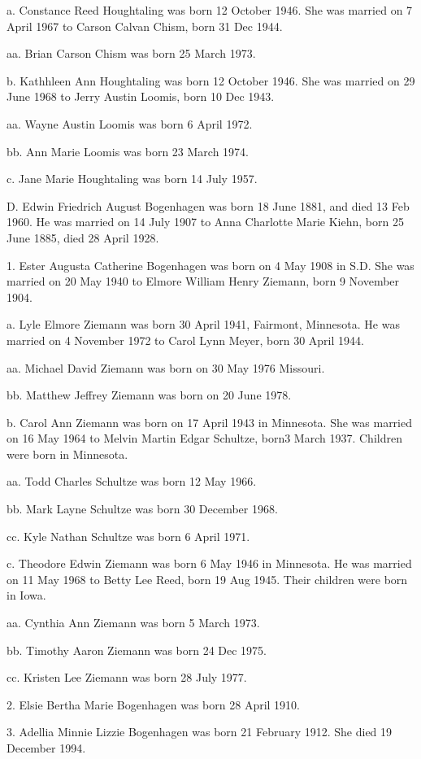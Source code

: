 \documentclass[a4paper]{article}
\begin{document}
a. Constance Reed Houghtaling was born 12 October 1946.  She was married on 7 April 1967 to Carson Calvan Chism, born 31 Dec 1944.
 
aa. Brian Carson Chism was born 25 March 1973.

b. Kathhleen Ann Houghtaling was born 12 October 1946.  She was married on 29 June 1968 to Jerry Austin Loomis, born 10 Dec 1943.
 
aa. Wayne Austin Loomis was born 6 April 1972.

bb. Ann Marie Loomis was born 23 March 1974.

c. Jane Marie Houghtaling was born 14 July 1957.  

D. Edwin Friedrich August Bogenhagen was born 18 June 1881, and died 13 Feb 1960. He was married on 14 July 1907 to Anna Charlotte Marie Kiehn, born 25 June 1885, died 28 April 1928.

1. Ester Augusta Catherine Bogenhagen was born on 4 May 1908 in S.D. She was married on 20 May 1940 to Elmore William Henry Ziemann, born 9 November 1904.

a. Lyle Elmore Ziemann was born 30 April 1941, Fairmont, Minnesota. He was married on 4 November 1972 to Carol Lynn Meyer, born 30 April 1944.

aa. Michael David Ziemann was born on 30 May 1976 Missouri.

bb. Matthew Jeffrey Ziemann was born on 20 June 1978.

b. Carol Ann Ziemann was born on 17 April 1943 in Minnesota.  She was married on 16 May 1964 to Melvin Martin Edgar Schultze, born3 March 1937.  Children were born in Minnesota.

aa. Todd Charles Schultze was born 12 May 1966.

bb. Mark Layne Schultze was born 30 December 1968.

cc. Kyle Nathan Schultze was born 6 April 1971.

c. Theodore Edwin Ziemann was born 6 May 1946 in Minnesota.  He was married on 11 May 1968 to Betty Lee Reed, born 19 Aug 1945. Their children were born in Iowa.

aa. Cynthia Ann Ziemann was born 5 March 1973.

bb. Timothy Aaron Ziemann was born 24 Dec 1975.

cc. Kristen Lee Ziemann was born 28 July 1977.

2. Elsie Bertha Marie Bogenhagen was born 28 April 1910.

3. Adellia Minnie Lizzie Bogenhagen was born 21 February 1912.  She died 19 December 1994.
\end{document}
